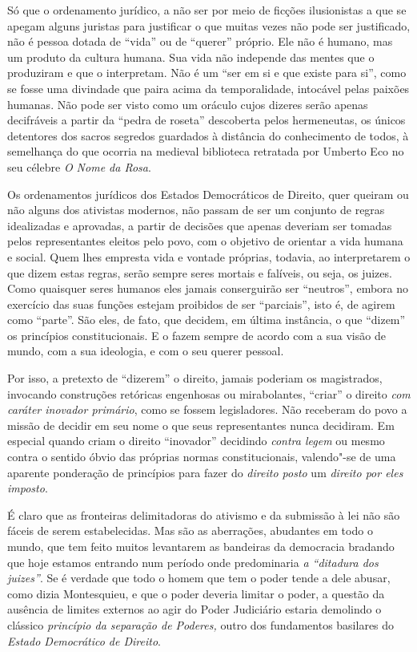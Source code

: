 Só que o ordenamento jurídico, a não ser por meio de ficções
ilusionistas a que se apegam alguns juristas para justificar o que
muitas vezes não pode ser justificado, não é pessoa dotada de
``vida'' ou de ``querer'' próprio. Ele não é humano, mas
um produto da cultura humana. Sua vida não independe das mentes que o
produziram e que o interpretam. Não é um ``ser em si e que existe
para si'', como se fosse uma divindade que paira acima da
temporalidade, intocável pelas paixões humanas. Não pode ser visto como
um oráculo cujos dizeres serão apenas decifráveis a partir da
``pedra de roseta'' descoberta pelos hermeneutas, os únicos
detentores dos sacros segredos guardados à distância do conhecimento de
todos, à semelhança do que ocorria na medieval biblioteca retratada por
Umberto Eco no seu célebre \emph{O Nome da Rosa}.

Os ordenamentos jurídicos dos Estados Democráticos de Direito, quer
queiram ou não alguns dos ativistas modernos, não passam de ser um
conjunto de regras idealizadas e aprovadas, a partir de decisões que
apenas deveriam ser tomadas pelos representantes eleitos pelo povo, com
o objetivo de orientar a vida humana e social. Quem lhes empresta vida e
vontade próprias, todavia, ao interpretarem o que dizem estas regras,
serão sempre seres mortais e falíveis, ou seja, os juizes. Como
quaisquer seres humanos eles jamais conserguirão ser ``neutros'',
embora no exercício das suas funções estejam proibidos de ser
``parciais'', isto é, de agirem como ``parte''. São eles,
de fato, que decidem, em última instância, o que ``dizem'' os princípios
constitucionais. E o fazem sempre de acordo com a sua visão de mundo,
com a sua ideologia, e com o seu querer pessoal.

Por isso, a pretexto de ``dizerem'' o direito, jamais poderiam os
magistrados, invocando construções retóricas engenhosas ou mirabolantes,
``criar'' o direito \emph{com caráter inovador primário}, como se
fossem legisladores. Não receberam do povo a missão de decidir em seu
nome o que seus representantes nunca decidiram. Em especial quando criam
o direito ``inovador'' decidindo \emph{contra legem} ou mesmo contra o
sentido óbvio das próprias normas constitucionais, valendo"-se de uma
aparente ponderação de princípios para fazer do \emph{direito posto} um
\emph{direito por eles imposto}.

É claro que as fronteiras delimitadoras do ativismo e da submissão à lei
não são fáceis de serem estabelecidas. Mas são as aberrações, abudantes
em todo o mundo, que tem feito muitos levantarem as bandeiras da
democracia bradando que hoje estamos entrando num período onde
predominaria \emph{a ``ditadura dos juizes''}. Se é verdade que todo o
homem que tem o poder tende a dele abusar, como dizia Montesquieu, e que
o poder deveria limitar o poder, a questão da ausência de limites
externos ao agir do Poder Judiciário estaria demolindo o clássico
\emph{princípio da separação de Poderes,} outro dos fundamentos
basilares do \emph{Estado Democrático de Direito}.

